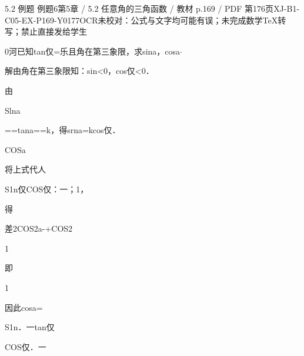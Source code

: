 \begin{bankitem}{5.2 例题 例题6}{第5章 / 5.2 任意角的三角函数 / 教材 p.169 / PDF 第176页}{XJ-B1-C05-EX-P169-Y0177}{OCR未校对：公式与文字均可能有误；未完成数学TeX转写；禁止直接发给学生}
\begin{ocrdraft}
\par
0河已知tan仅=乐且角在第三象限，求sina，cosa\ensuremath{\cdot}
\par
解由角在第三象限知：sin<0，cos仅<0．
\par
由
\par
Slna
\par
==tana==k，得srna=kcos仅．
\par
COSa
\par
将上式代人
\par
S1n仅COS仅：一；1，
\par
得
\par
差2COS2a-+COS2
\par
1
\par
即
\par
1
\par
因此cosa=
\par
S1n．一tan仅
\par
COS仅．一
\end{ocrdraft}
\end{bankitem}
